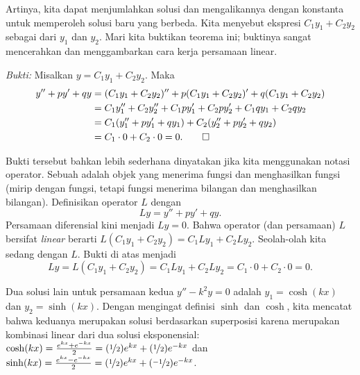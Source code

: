 Artinya, kita dapat menjumlahkan solusi dan mengalikannya dengan konstanta untuk memperoleh solusi baru yang berbeda. Kita menyebut ekspresi $C_1 y_1 + C_2 y_2$ sebagai \emph{} dari $y_1$ dan $y_2$. Mari kita buktikan teorema ini; buktinya sangat mencerahkan dan menggambarkan cara kerja persamaan linear.

\medskip

\emph{Bukti:}
Misalkan $y = C_1 y_1 + C_2 y_2$. Maka
\begin{equation*}
\begin{split}
y'' + py' + qy & =
(C_1 y_1 + C_2 y_2)'' + p(C_1 y_1 + C_2 y_2)' + q(C_1 y_1 + C_2 y_2) \\
& = C_1 y_1'' + C_2 y_2'' + C_1 p y_1' + C_2 p y_2' + C_1 q y_1 + C_2 q y_2 \\
& = C_1 ( y_1'' + p y_1' + q y_1 ) + C_2 ( y_2'' + p y_2' + q y_2 ) \\
& = C_1 \cdot 0 + C_2 \cdot 0 = 0 . \qed
\end{split}
\end{equation*}

\medskip

Bukti tersebut bahkan lebih sederhana dinyatakan jika kita menggunakan notasi operator. Sebuah \emph{} adalah objek yang menerima fungsi dan menghasilkan fungsi (mirip dengan fungsi, tetapi fungsi menerima bilangan dan menghasilkan bilangan). Definisikan operator $L$ dengan
\begin{equation*}
Ly = y'' + py' + qy .
\end{equation*}
Persamaan diferensial kini menjadi $Ly=0$.
Bahwa operator (dan persamaan) $L$ bersifat \emph{linear} berarti $L(C_1y_1 + C_2y_2) = C_1 Ly_1 + C_2 Ly_2$. Seolah-olah kita sedang  dengan $L$. Bukti di atas menjadi
\begin{equation*}
Ly = L(C_1y_1 + C_2y_2) = C_1 Ly_1 + C_2 Ly_2 = C_1 \cdot 0 + C_2 \cdot 0 = 0 .
\end{equation*}

\medskip

Dua solusi lain untuk persamaan kedua $y'' - k^2y = 0$ adalah $y_1 = \cosh (kx)$ dan $y_2 = \sinh (kx)$. Dengan mengingat definisi $\sinh$ dan $\cosh$, kita mencatat bahwa keduanya merupakan solusi berdasarkan superposisi karena merupakan kombinasi linear dari dua solusi eksponensial:
$\cosh(kx) = \frac{e^{kx}  + e^{-kx}}{2} = (\nicefrac{1}{2}) e^{kx}  +
(\nicefrac{1}{2}) e^{-kx}$ dan
$\sinh(kx) = \frac{e^{kx} - e^{-kx}}{2} = (\nicefrac{1}{2}) e^{kx}  +
(\nicefrac{-1}{2}) e^{-kx}$.

